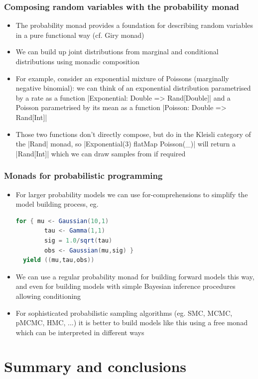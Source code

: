 \documentclass[mathserif,handout]{beamer}
\begin{document}
\begin{frame}[fragile]
  \frametitle{Composing random variables with the probability monad}
  \begin{itemize}
  \item The \alert{probability monad} provides a foundation for describing random variables in a pure functional way (cf. \alert{Giry monad})
  \item We can build up joint distributions from marginal and conditional distributions using \alert{monadic composition}
  \item For example, consider an exponential mixture of Poissons (marginally negative binomial): we can think of an exponential distribution parametrised by a rate as a function |Exponential: Double => Rand[Double]| and a Poisson parametrised by its mean as a function |Poisson: Double => Rand[Int]|
    \item Those two functions don't directly compose, but do in the Kleisli category of the |Rand| monad, so |Exponential(3) flatMap {Poisson(_)}| will return a |Rand[Int]| which we can draw samples from if required
  \end{itemize}
\end{frame}


\begin{frame}[fragile]
  \frametitle{Monads for probabilistic programming}
  \begin{itemize}
    \item For larger probability models we can use \alert{for-comprehensions} to simplify the model building process, eg.
\begin{lstlisting}[language=scala]
  for { mu <- Gaussian(10,1)
        tau <- Gamma(1,1)
        sig = 1.0/sqrt(tau)
        obs <- Gaussian(mu,sig) }
  yield ((mu,tau,obs))
\end{lstlisting}
  \item We can use a regular probability monad for building forward models this way, and even for building models with simple Bayesian inference procedures allowing conditioning
    \item For sophisticated probabilistic sampling algorithms (eg. SMC, MCMC, pMCMC, HMC, ...) it is better to build models like this using a \alert{free monad} which can be \alert{interpreted} in different ways
  \end{itemize}
\end{frame}

\section{Summary and conclusions}
\end{document}
